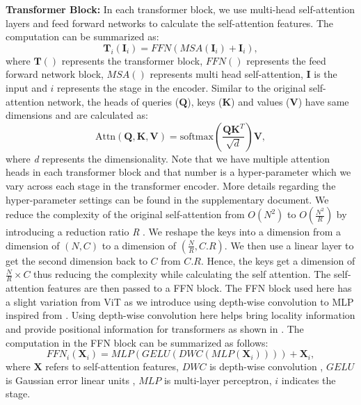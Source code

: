 \documentclass[10pt,twocolumn,letterpaper]{article}
\begin{document}
\noindent \textbf{Transformer Block:} In each transformer block, we use multi-head self-attention layers and feed forward networks to calculate the self-attention features. The computation can be summarized as:
\begin{equation}
	\textbf{T}_i(\textbf{I}_i) = FFN(MSA(\textbf{I}_i)+\textbf{I}_i),
\end{equation}
where $\textbf{T}()$ represents the transformer block, $FFN()$ represents the feed forward network block, $MSA()$ represents multi head self-attention, $\textbf{I}$ is the input and $i$ represents the stage in the encoder. Similar to the original self-attention network, the heads of queries ($\textbf{Q}$), keys ($\textbf{K}$) and values ($\textbf{V}$) have same dimensions and are calculated as:
\begin{equation}
	\text{Attn}(\textbf{Q},\textbf{K},\textbf{V}) = \text{softmax}\left(\frac{\textbf{QK}^T}{\sqrt{d}}\right)\textbf{V},
\end{equation}
where \textit{d} represents the dimensionality. Note that we have multiple attention heads in each transformer block and that number is a hyper-parameter which we  vary across each stage in the transformer encoder. More details regarding the hyper-parameter settings can be found in the supplementary document.  We reduce the complexity of the original self-attention from $O(N^2)$ to $O(\frac{N^2}{R})$ by introducing a reduction ratio \textit{R} \cite{wang2021pyramid}. We reshape the keys into a dimension from a dimension of $(N,C)$ to a dimension of $(\frac{N}{R}, C.R) $. We then use a linear layer to get the second dimension back to $C$ from $C.R$. Hence, the keys get a dimension of $\frac{N}{R} \times C$ thus reducing the complexity while calculating the self attention. The self-attention features are then passed to a FFN block. 
The FFN block used here has a slight variation from ViT as we introduce using depth-wise convolution to MLP inspired from \cite{wu2021cvt,xie2021segformer, li2021localvit}. Using depth-wise convolution here helps bring locality information and provide positional information for transformers as shown in \cite{xie2021segformer}. The computation in the FFN block can be summarized as follows:
\begin{equation}
	\nonumber  FFN_i(\textbf{X}_i) = MLP(GELU(DWC(MLP(\textbf{X}_i)))) + \textbf{X}_i,    
\end{equation}
where $\textbf{X}$ refers to self-attention features, $DWC$ is depth-wise convolution \cite{chollet2017xception}, $GELU$ is Gaussian error linear units \cite{hendrycks2016gaussian}, $MLP$ is multi-layer perceptron, $i$ indicates the stage.
\end{document}
